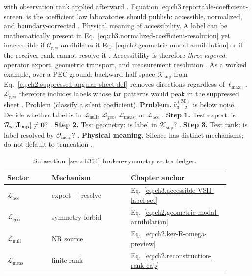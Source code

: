 with observation rank applied afterward \cite{harrington2001}. Equation
\eqref{eq:ch3.reportable-coefficient-screen} is the coefficient law laboratories should publish: accessible,
normalized, and boundary-corrected \cite{hansen1988}.
Physical meaning of accessibility. A label can be mathematically present in Eq.~\eqref{eq:ch3.normalized-coefficient-resolution} yet inaccessible if
\(\mathcal{C}_{\mathrm{geo}}\) annihilates it Eq.~\eqref{eq:ch2.geometric-modal-annihilation} or if the receiver
rank cannot resolve it \cite{harrington2001}. Accessibility is therefore \emph{three-layered}: operator
export, geometric transport, and measurement resolution \cite{harrington2001}.
As a worked example, over a PEC ground, backward half-space \(\mathcal{K}_{\mathrm{sup}}\) from Eq.~\eqref{eq:ch2.suppressed-angular-sheet-def}
removes directions regardless of \(\ell_{\max}\) \cite{stratton1941}. \(\mathcal{L}_{\mathrm{geo}}\) therefore
includes labels whose far patterns would peak in the suppressed sheet \cite{harrington2001}.
Problem (classify a silent coefficient). \textbf{Problem.} \(\widehat{c}_{3,-2}^{(\mathbf{M})}\) is below noise. Decide whether label is in
\(\mathcal{L}_{\mathrm{null}}\), \(\mathcal{L}_{\mathrm{geo}}\), \(\mathcal{L}_{\mathrm{meas}}\), or
\(\mathcal{L}_{\mathrm{acc}}\) \cite{harrington2001}.
\textbf{Step 1.} Test export: is \(\mathcal{R}_\omega[\mathbf{J}_{\mathrm{imp}}]\neq\mathbf{0}\)? \cite{harrington2001}.
\textbf{Step 2.} Test geometry: is label in \(\mathcal{K}_{\mathrm{sup}}\)? \cite{stratton1941}.
\textbf{Step 3.} Test rank: is label resolved by \(\mathcal{O}_{\mathrm{meas}}\)? \cite{devaney2004}.
\textbf{Physical meaning.} Silence has distinct mechanisms; do not default to truncation \cite{harrington2001}.
\begin{table}[t]
\centering
\caption{Subsection~\ref{sec:ch364} broken-symmetry sector ledger.}
\label{tab:ch3.364-sector-ledger}
\small
\begin{tabular}{@{}p{0.18\linewidth}p{0.32\linewidth}p{0.40\linewidth}@{}}
\toprule
Sector & Mechanism & Chapter anchor \\
\midrule
\(\mathcal{L}_{\mathrm{acc}}\) & export + resolve & Eq.~\eqref{eq:ch3.accessible-VSH-label-set} \\
\(\mathcal{L}_{\mathrm{geo}}\) & symmetry forbid & Eq.~\eqref{eq:ch2.geometric-modal-annihilation} \\
\(\mathcal{L}_{\mathrm{null}}\) & NR source & Eq.~\eqref{eq:ch2.ker-R-omega-preview} \\
\(\mathcal{L}_{\mathrm{meas}}\) & finite rank & Eq.~\eqref{eq:ch2.reconstruction-rank-cap} \\
\bottomrule
\end{tabular}
\end{table}
